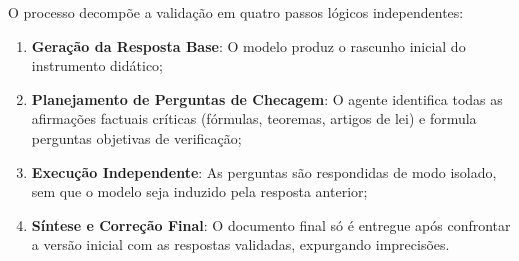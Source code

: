 O processo decomp{\~o}e a valida{\c c}{\~a}o em quatro passos l{\'o}gicos independentes:
\begin{enumerate}
  \item \textbf{Gera{\c c}{\~a}o da Resposta Base}: O modelo produz o rascunho inicial do instrumento did{\'a}tico;
  \item \textbf{Planejamento de Perguntas de Checagem}: O agente identifica todas as afirma{\c c}{\~o}es factuais cr{\'i}ticas (f{\'o}rmulas, teoremas, artigos de lei) e formula perguntas objetivas de verifica{\c c}{\~a}o;
  \item \textbf{Execu{\c c}{\~a}o Independente}: As perguntas s{\~a}o respondidas de modo isolado, sem que o modelo seja induzido pela resposta anterior;
  \item \textbf{S{\'i}ntese e Corre{\c c}{\~a}o Final}: O documento final s{\'o} {\'e} entregue ap{\'o}s confrontar a vers{\~a}o inicial com as respostas validadas, expurgando imprecis{\~o}es.
\end{enumerate}
